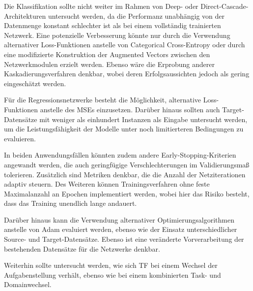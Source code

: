 Die Klassifikation sollte nicht weiter im Rahmen von Deep- oder Direct-Cascade-Architekturen untersucht werden, da die Performanz unabhängig von 
der Datenmenge konstant schlechter ist als bei einem vollständig trainierten Netzwerk. Eine potenzielle Verbesserung könnte nur durch die 
Verwendung alternativer Loss-Funktionen anstelle von Categorical Cross-Entropy oder durch eine modifizierte Konstruktion der Augmented Vectors 
zwischen den Netzwerkmodulen erzielt werden. Ebenso wäre die Erprobung anderer Kaskadierungsverfahren denkbar, wobei deren Erfolgsaussichten 
jedoch als gering eingeschätzt werden.

Für die Regressionsnetzwerke besteht die Möglichkeit, alternative Loss-Funktionen anstelle des MSEs einzusetzen. 
Darüber hinaus sollten auch Target-Datensätze mit weniger als einhundert Instanzen als Eingabe untersucht werden, um die Leistungsfähigkeit 
der Modelle unter noch limitierteren Bedingungen zu evaluieren.

In beiden Anwendungsfällen könnten zudem andere Early-Stopping-Kriterien angewandt werden, die auch geringfügige Verschlechterungen im 
Validierungsmaß tolerieren. Zusätzlich sind Metriken denkbar, die die Anzahl der Netziterationen adaptiv steuern. Des Weiteren können 
Trainingsverfahren ohne feste Maximalanzahl an Epochen implementiert werden, wobei hier das Risiko besteht, dass das Training unendlich lange 
andauert.

Darüber hinaus kann die Verwendung alternativer Optimierungsalgorithmen anstelle von Adam evaluiert werden, ebenso wie der Einsatz 
unterschiedlicher Source- und Target-Datensätze. Ebenso ist eine veränderte Vorverarbeitung der bestehenden Datensätze für die Netzwerke 
denkbar.

Weiterhin sollte untersucht werden, wie sich TF bei einem Wechsel der Aufgabenstellung verhält, ebenso wie bei einem 
kombinierten Task- und Domainwechsel.
